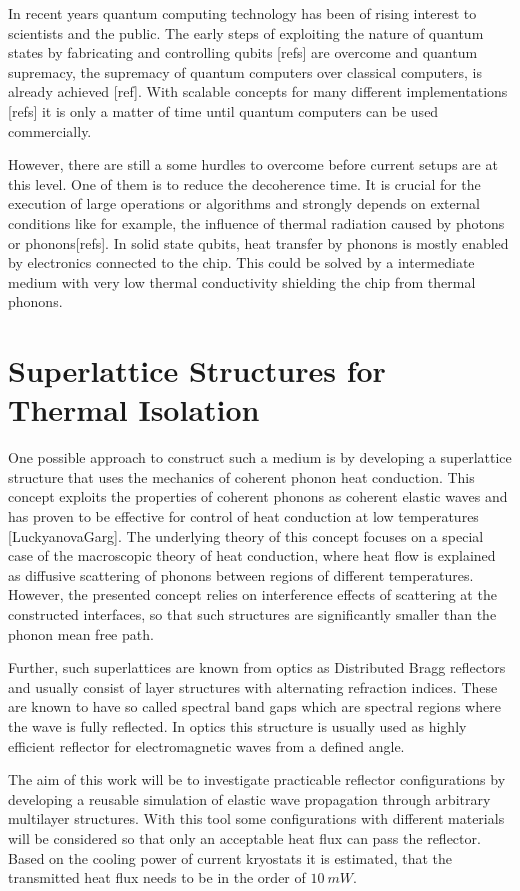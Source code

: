 In recent years quantum computing technology has been of rising
interest to scientists and the public. The early steps of exploiting the nature
of quantum states by fabricating and controlling qubits [refs] are
overcome and quantum supremacy, the supremacy of quantum computers over
classical computers, is already achieved [ref]. With scalable concepts for many
different implementations [refs] it is only a matter of time until quantum
computers can be used commercially.

However, there are still a some hurdles to overcome before current setups are
at this level. One of them is to reduce the decoherence time. It is crucial for
the execution of large operations or algorithms and strongly
depends on external conditions like for example, the influence of thermal
radiation caused by photons or phonons[refs]. In solid state qubits, heat
transfer by phonons is mostly enabled by electronics connected to the chip.
This could be solved by a intermediate medium with very low thermal
conductivity shielding the chip from thermal phonons.

\section{Superlattice Structures for Thermal Isolation}
One possible approach to
construct such a medium is by developing a superlattice structure that
uses the mechanics of coherent phonon heat conduction. This concept exploits
the properties of coherent phonons as coherent elastic waves and has proven
to be effective for control of heat conduction at low temperatures
    [LuckyanovaGarg]. The underlying theory of this concept focuses on a
special case of the macroscopic theory of heat conduction, where heat flow is
explained as diffusive scattering of phonons between regions of different
temperatures.
However, the presented concept relies on interference effects of scattering
at the constructed interfaces, so that such structures are significantly
smaller than the phonon mean free path.

Further, such superlattices are known from optics as Distributed Bragg
reflectors and usually consist of layer structures with alternating refraction
indices. These are known to have so called spectral band gaps which are
spectral regions where the wave is fully reflected.
In optics this structure is usually used as highly efficient reflector for
electromagnetic waves from a defined angle.

The aim of this work will be to investigate practicable reflector
configurations by developing a reusable simulation of elastic wave propagation
through arbitrary multilayer structures. With this tool some configurations
with different materials will be considered so that only an acceptable heat
flux can pass the reflector. %
Based on the cooling power of current kryostats it is estimated, that the
transmitted heat flux needs to be in the order of $10\ \si{mW}$.

